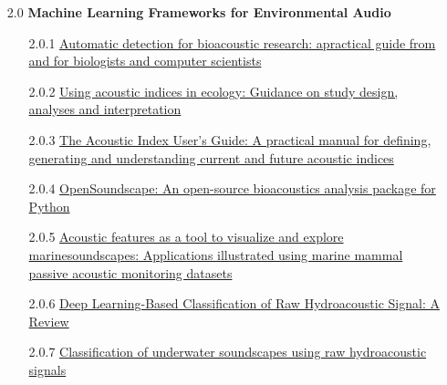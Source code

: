 \begin{enumerate}
\begin{enumerate}
        \item [2.0] \textbf{Machine Learning Frameworks for Environmental Audio}
            \begin{enumerate}
                \item [2.0.1] \href{https://doi.org/10.1111/brv.13155}{Automatic detection for bioacoustic research: apractical guide from and for biologists and computer scientists}
                \item [2.0.2] \href{https://doi.org/10.1111/2041-210X.14194}{Using acoustic indices in ecology: Guidance on study design, analyses and interpretation}
                \item [2.0.3] \href{https://doi.org/10.1111/2041-210X.14357}{The Acoustic Index User's Guide: A practical manual for defining, generating and understanding current and future acoustic indices}
                \item [2.0.4] \href{https://doi.org/10.1111/2041-210X.14196}{OpenSoundscape: An open-source bioacoustics analysis package for Python}
                \item [2.0.5] \href{https://doi.org/10.1002/ece3.10951}{Acoustic features as a tool to visualize and explore marinesoundscapes: Applications illustrated using marine mammal passive acoustic monitoring datasets}
                \item [2.0.6] \href{https://doi.org/10.3390/jmse11010003}{Deep Learning-Based Classification of Raw Hydroacoustic Signal: A Review}
                \item [2.0.7] \href{https://doi.org/10.1121/10.0023608}{Classification of underwater soundscapes using raw hydroacoustic signals}
            \end{enumerate}
        

\end{enumerate}
\end{enumerate}
